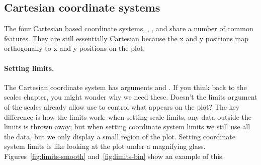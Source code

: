 \subsection{Cartesian coordinate systems}
\label{sub:cartesian}

The four Cartesian based coordinate systems, , ,  and  share a number of common features.  They are still essentially Cartesian because the x and y positions map orthogonally to x and y positions on the plot.  

\paragraph{Setting limits.}  The Cartesian coordinate system has arguments  and .  If you think back to the scales chapter, you might wonder why we need these.  Doesn't the limits argument of the scales already allow use to control what appears on the plot?  The key difference is how the limits work: when setting scale limits, any data outside the limits is thrown away; but when setting coordinate system limits we still use all the data, but we only display a small region of the plot.  Setting coordinate system limits is like looking at the plot under a magnifying glass.  Figures~\ref{fig:limits-smooth} and~\ref{fig:limits-bin} show an example of this.

% 


% 


